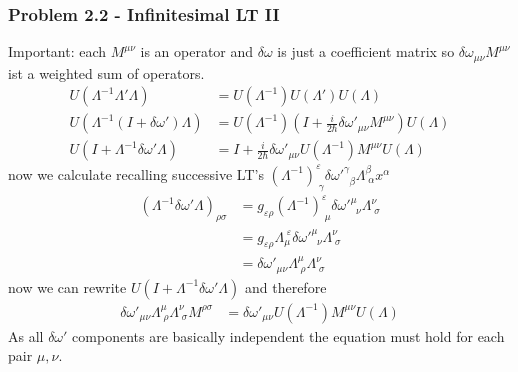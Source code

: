 \documentclass[10pt,a4paper]{book}
\theoremstyle{definition}
\begin{document}
\subsubsection{Problem 2.2 - Infinitesimal LT II}
Important: each $M^{\mu\nu}$ is an operator and $\delta\omega$ is just a coefficient matrix so $\delta\omega _{\mu\nu}M^{\mu\nu}$ ist a weighted sum of operators.
\begin{align}
U(\Lambda^{-1}\Lambda'\Lambda)&=U(\Lambda^{-1})U(\Lambda')U(\Lambda)\\
U(\Lambda^{-1}(I+\delta\omega')\Lambda)&=U(\Lambda^{-1})\left(I+\frac{i}{2\hbar}\delta\omega'_{\mu\nu}M^{\mu\nu}\right)U(\Lambda)\\
U(I+\Lambda^{-1}\delta\omega'\Lambda)&=I+\frac{i}{2\hbar}\delta\omega'_{\mu\nu}U(\Lambda^{-1})M^{\mu\nu}U(\Lambda)
\end{align}
now we calculate recalling successive LT's $(\Lambda^{-1})^{\varepsilon}_{\;\gamma}\delta\omega'^\gamma_{\;\;\beta}\Lambda^\beta_{\;\alpha}x^\alpha$
\begin{align}
(\Lambda^{-1}\delta\omega'\Lambda)_{\rho\sigma}
&=g_{\varepsilon\rho}(\Lambda^{-1})^{\varepsilon}_{\;\mu}\delta\omega'^\mu_{\;\;\nu}\Lambda^\nu_{\;\sigma}\\
&=g_{\varepsilon\rho}\Lambda^{\;\varepsilon}_{\mu}\delta\omega'^\mu_{\;\;\nu}\Lambda^\nu_{\;\sigma}\\
&=\delta\omega'_{\mu\nu}\Lambda^{\mu}_{\;\rho}\Lambda^\nu_{\;\sigma}
\end{align}
now we can rewrite $U(I+\Lambda^{-1}\delta\omega'\Lambda)$ and therefore
\begin{align}
\delta\omega'_{\mu\nu}\Lambda^{\mu}_{\;\rho}\Lambda^\nu_{\;\sigma}M^{\rho\sigma}&=\delta\omega'_{\mu\nu}U(\Lambda^{-1})M^{\mu\nu}U(\Lambda)
\end{align}
As all $\delta\omega'$ components are basically independent the equation must hold for each pair $\mu,\nu$.
\end{document}
